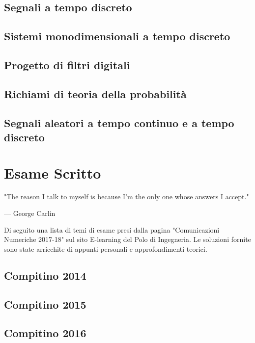\documentclass[12pt,oneside,openany]{memoir}
\numberwithin{equation}{subsection}
\begin{document}
\newpage
\section{Segnali a tempo discreto}

\newpage
\section{Sistemi monodimensionali a tempo discreto}

\newpage
\section{Progetto di filtri digitali}

\newpage
\section{Richiami di teoria della probabilit\`a}

\newpage
\section{Segnali aleatori a tempo continuo e a tempo discreto}


\chapter{Esame Scritto}
\epigraph{"The reason I talk to myself is because I'm the only one whose answers I accept."}{--- \textup{George Carlin}}

Di seguito una lista di temi di esame presi dalla pagina "Comunicazioni Numeriche 2017-18" sul sito E-learning del Polo di Ingegneria. Le soluzioni fornite sono state arricchite di appunti personali e approfondimenti teorici.

\newpage
\section{Compitino 2014}

\newpage
\section{Compitino 2015}

\newpage
\section{Compitino 2016}
\end{document}
